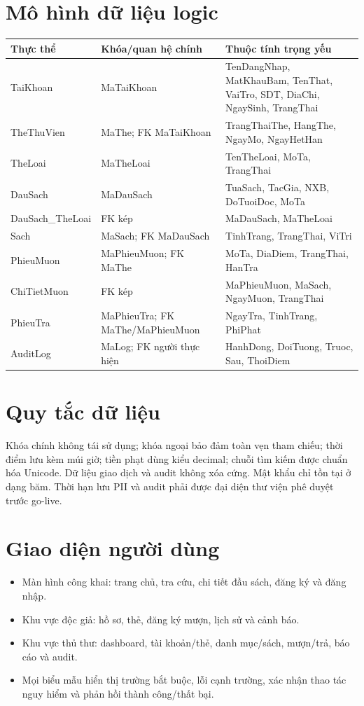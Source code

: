 \documentclass[12pt,a4paper,oneside]{report}
\begin{document}
\section{Mô hình dữ liệu logic}
\begin{longtable}{L{3cm}L{4.2cm}L{7cm}}
\toprule Thực thể & Khóa/quan hệ chính & Thuộc tính trọng yếu\\\midrule\endhead
TaiKhoan & MaTaiKhoan & TenDangNhap, MatKhauBam, TenThat, VaiTro, SDT, DiaChi, NgaySinh, TrangThai\\
TheThuVien & MaThe; FK MaTaiKhoan & TrangThaiThe, HangThe, NgayMo, NgayHetHan\\
TheLoai & MaTheLoai & TenTheLoai, MoTa, TrangThai\\
DauSach & MaDauSach & TuaSach, TacGia, NXB, DoTuoiDoc, MoTa\\
DauSach\_\allowbreak TheLoai & FK kép & MaDauSach, MaTheLoai\\
Sach & MaSach; FK MaDauSach & TinhTrang, TrangThai, ViTri\\
PhieuMuon & MaPhieuMuon; FK MaThe & MoTa, DiaDiem, TrangThai, HanTra\\
ChiTietMuon & FK kép & MaPhieuMuon, MaSach, NgayMuon, TrangThai\\
PhieuTra & MaPhieuTra; FK MaThe/MaPhieuMuon & NgayTra, TinhTrang, PhiPhat\\
AuditLog & MaLog; FK người thực hiện & HanhDong, DoiTuong, Truoc, Sau, ThoiDiem\\
\bottomrule
\end{longtable}

\section{Quy tắc dữ liệu}
Khóa chính không tái sử dụng; khóa ngoại bảo đảm toàn vẹn tham chiếu; thời điểm lưu kèm múi giờ; tiền phạt dùng kiểu decimal; chuỗi tìm kiếm được chuẩn hóa Unicode. Dữ liệu giao dịch và audit không xóa cứng. Mật khẩu chỉ tồn tại ở dạng băm. Thời hạn lưu PII và audit phải được đại diện thư viện phê duyệt trước go-live.

\section{Giao diện người dùng}
\begin{itemize}
\item Màn hình công khai: trang chủ, tra cứu, chi tiết đầu sách, đăng ký và đăng nhập.
\item Khu vực độc giả: hồ sơ, thẻ, đăng ký mượn, lịch sử và cảnh báo.
\item Khu vực thủ thư: dashboard, tài khoản/thẻ, danh mục/sách, mượn/trả, báo cáo và audit.
\item Mọi biểu mẫu hiển thị trường bắt buộc, lỗi cạnh trường, xác nhận thao tác nguy hiểm và phản hồi thành công/thất bại.
\end{itemize}
\end{document}
